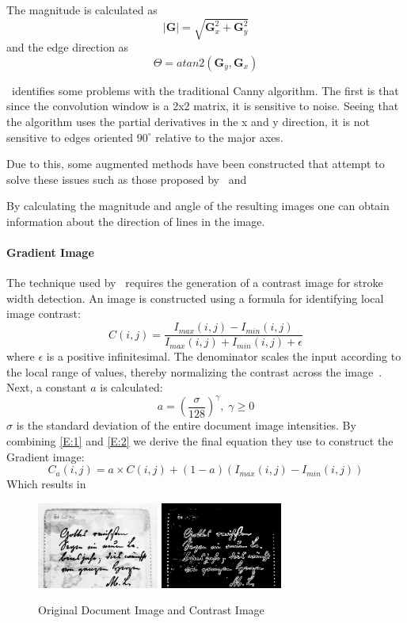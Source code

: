 \documentclass[a4paper, 12pt]{report}
\begin{document}
The magnitude is calculated as
\[|\mathbf{G}|=\sqrt{\mathbf{G}_x^2+\mathbf{G}_y^2}\]
and the edge direction as
\[\Theta=atan2(\mathbf{G}_y,\mathbf{G}_x)\]

~\cite{rong2014improved}identifies some problems with the traditional Canny algorithm. The first is that since the convolution window is a 2x2 matrix, it is sensitive to noise. Seeing that the algorithm uses the partial derivatives in the x and y direction, it is not sensitive to edges oriented $90^{\circ}$ relative to the major axes.\par

Due to this, some augmented methods have been constructed that attempt to solve
these issues such as those proposed by~\cite{rong2014improved}
and~\cite{xuan2017improved}

By calculating the magnitude and angle of the resulting images one can obtain
information about the direction of lines in the image.

\paragraph{Gradient Image}
The technique used by~\cite{su2012robust} requires the generation of a contrast
image for stroke width detection. An image is constructed using a formula for
identifying local image contrast:
\begin{equation}
    \label{E:4}
    C(i,j)=\frac{I_{max}(i,j)-I_{min}(i,j)}{I_{max}(i,j)+I_{min}(i,j)+\epsilon}
\end{equation}
where \(\epsilon\) is a positive infinitesimal. The denominator scales the input according to the local range of values, thereby normalizing the contrast across the image~\cite{su2012robust}. Next, a constant \(a\) is calculated:
\begin{equation}
    \label{E:5}
    a=(\frac{\sigma}{128})^\gamma, \; \gamma \geq 0
\end{equation}
\(\sigma\) is the standard deviation of the entire document image intensities.
By combining \ref{E:1} and \ref{E:2} we derive the final equation they use to construct the Gradient image:
\begin{equation}
    \label{E:6}
    C_a(i,j)=a\times C(i,j)+(1-a)(I_{max}(i,j)-I_{min}(i,j))
\end{equation}
Which results in
\begin{figure}[htp]
    \centering
    \includegraphics[width=4cm]{original.png}
    \includegraphics[width=4cm]{contrast-image.png}
    \caption{Original Document Image and Contrast Image}
    \label{fig:contrast}
\end{figure}
\end{document}
